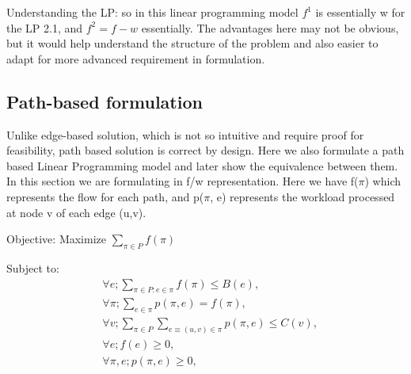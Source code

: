 \documentclass[twoside,leqno, 11pt]{article}
\begin{document}
Understanding the LP: so in this linear programming model $f^1 $ is essentially w for the LP 2.1, and $f^2 = f-w$ essentially. The advantages here may not be obvious, but it would help understand the structure of the problem and also easier to adapt for more advanced requirement in formulation.%

\subsection{Path-based formulation}
Unlike edge-based solution, which is not so intuitive and require proof for feasibility, path based solution is correct by design. Here we also formulate a path based Linear Programming model and later show the equivalence between them.
In this section we are formulating in f/w representation. Here we have f($\pi$) which represents the flow for each path, and p($\pi$, e) represents the workload processed at node v of each edge (u,v).

Objective: Maximize  $\sum \limits_{\pi\in P} f(\pi) $

Subject to:
\begin{subequations}
\begin{align}
&\forall e; \sum \limits_{\pi\in P:e\in \pi} f(\pi) \leq B(e),\\
&\forall \pi; \sum \limits_{e\in \pi} p(\pi, e) = f(\pi),\\
&\forall  v; \sum \limits_{\pi\in P} \sum \limits_{ e\equiv (u,v)\in \pi} p(\pi, e) \leq C(v),\\
&\forall e; f(e)\geq 0, \\
&\forall \pi, e; p(\pi,e) \geq 0,
\end{align}
\end{subequations}

\end{document}
